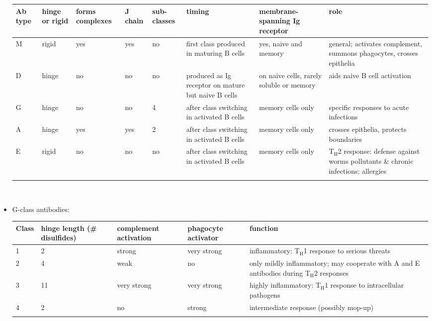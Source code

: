 \documentclass[UTF8]{book}
\newcommand{\et}{&}
\begin{document}
\begin{itemize}
\begin{tabular}{m{0.5cm}<{\centering}m{0.5cm}<{\centering}m{1cm}<{\centering}m{0.8cm}<{\centering}m{0.8cm}<{\centering}m{2cm}<{\centering}m{1.6cm}<{\centering}m{4cm}<{\centering}} \Xhline{1.2pt}
\centering
Ab type \et hinge or rigid \et forms complexes \et J chain \et sub-classes \et timing \et membrane-spanning Ig receptor \et role \\ \hline
M \et rigid \et yes \et yes \et  no \et first class produced in maturing B cells \et yes, naive and memory \et general; activates complement, summons phagocytes, crosses epithelia \\ \hline
D \et hinge \et no \et no \et no \et produced as Ig receptor on mature but naive B cells \et on naive cells, rarely soluble or memory \et aids naive B cell activation \\ \hline
G \et hinge \et no \et no \et 4 \et after class switching in activated B cells \et memory cells only \et specific responses to acute infections \\ \hline
A \et hinge \et yes \et yes \et 2 \et after class switching in activated B cells \et memory cells only \et crosses epithelia, protects boundaries \\ \hline
E \et rigid \et no \et no \et no \et after class switching in activated B cells \et memory cells only \et T$_\mathrm{H}$2 response: defense against worms pollutants \& chronic infections; allergies \\ \Xhline{1.2pt}
\end{tabular}
\\
\item G-class antibodies:
\begin{center}
\begin{tabular}{m{1cm}<{\centering}m{2cm}<{\centering}m{1.5cm}<{\centering}m{1.5cm}<{\centering}m{5cm}<{\centering}} \Xhline{1.2pt}
Class \et hinge length (\# disulfides) \et complement activation \et phagocyte activator \et function \\ \hline
1 \et 2 \et strong \et very strong \et inflammatory: T$_{\mathrm{H}}$1 response to serious threats \\ \hline
2 \et 4 \et weak \et no \et only mildly inflammatory; may cooperate with A and E antibodies during T$_{\mathrm{H}}$2 responses \\ \hline
3 \et 11 \et very strong \et very strong \et highly inflammatory: T$_{\mathrm{H}}$1 response to intracellular pathogens \\ \hline
4 \et 2 \et no \et strong \et intermediate response (possibly mop-up) \\ \Xhline{1.2pt}

\end{tabular}
\end{center}
\end{itemize}
\end{document}
